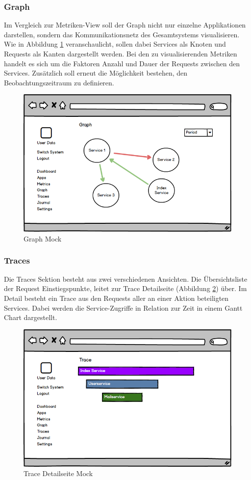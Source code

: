 \subsubsection{Graph}

Im Vergleich zur Metriken-View soll der Graph nicht nur einzelne Applikationen darstellen,
sondern das Kommunikationsnetz des Gesamtsystems visualisieren.
Wie in Abbildung \ref{fig:graph} veranschaulicht, sollen dabei Services als Knoten und Requests als Kanten dargestellt werden.
Bei den zu visualisierenden Metriken handelt es sich um die Faktoren Anzahl und Dauer der Requests zwischen den Services.
Zusätzlich soll erneut die Möglichkeit bestehen, den Beobachtungszeitraum zu definieren.

\begin{figure}[h]
 \centering
 \includegraphics[width=0.6\linewidth]{kapitel1/mocks/graph.png}
 \caption{Graph Mock}
 \label{fig:graph}
\end{figure}

\subsubsection{Traces}

Die Traces Sektion besteht aus zwei verschiedenen Ansichten. Die Übersichtsliste der Request Einstiegspunkte,
leitet zur Trace Detailseite (Abbildung \ref{fig:trace}) über. Im Detail besteht ein Trace aus den Requests
aller an einer Aktion beteiligten Services. Dabei werden die Service-Zugriffe in Relation zur Zeit in einem Gantt Chart dargestellt.

\vspace{0.3cm}
\begin{figure}[h]
 \centering
 \includegraphics[width=0.7\linewidth]{kapitel1/mocks/trace.png}
 \caption{Trace Detailseite Mock}
 \label{fig:trace}
\end{figure}


